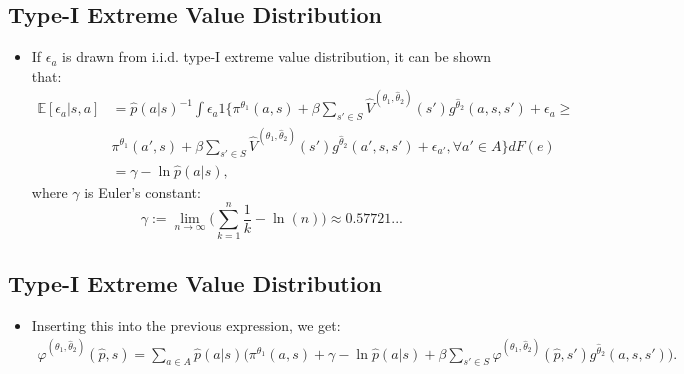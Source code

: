 \documentclass[
]{book}
\providecommand{\tightlist}{%
  \setlength{\itemsep}{0pt}\setlength{\parskip}{0pt}}
\begin{document}
\hypertarget{type-i-extreme-value-distribution-1}{%
\subsection{Type-I Extreme Value Distribution}\label{type-i-extreme-value-distribution-1}}

\begin{itemize}
\tightlist
\item
  If \(\epsilon_a\) is drawn from i.i.d. type-I extreme value distribution, it can be shown that:
  \begin{equation}
  \begin{split}
  \mathbb{E}[\epsilon_{a}|s, a] &= \hat{p}(a|s)^{-1} \int \epsilon_a 1\Bigg\{\pi^{\theta_1}(a , s) + \beta \sum_{s' \in S} \hat{V}^{(\theta_1, \hat{\theta}_2)}(s') g^{\hat{\theta}_2}(a, s, s') + \epsilon_a \ge\\
  &\pi^{\theta_1}(a' , s) + \beta \sum_{s' \in S} \hat{V}^{(\theta_1, \hat{\theta}_2)}(s') g^{\hat{\theta}_2}(a', s, s') + \epsilon_{a'}, \forall a' \in A \Bigg\}dF(e)\\
  &= \gamma - \ln \hat{p}(a|s),
  \end{split}
  \end{equation}
  where \(\gamma\) is Euler's constant:
  \begin{equation}
  \gamma := \lim_{n \to \infty} \Bigg(\sum_{k = 1}^n \frac{1}{k} - \ln(n) \Bigg) \approx 0.57721...
  \end{equation}
\end{itemize}

\hypertarget{type-i-extreme-value-distribution-2}{%
\subsection{Type-I Extreme Value Distribution}\label{type-i-extreme-value-distribution-2}}

\begin{itemize}
\tightlist
\item
  Inserting this into the previous expression, we get:
  \begin{equation}
  \begin{split}
  \varphi^{(\theta_1, \hat{\theta}_2)}(\hat{p}, s) = \sum_{a \in A}\hat{p}(a|s)\Bigg(\pi^{\theta_1}(a, s) + \gamma - \ln \hat{p}(a|s) + \beta \sum_{s' \in S} \varphi^{(\theta_1, \hat{\theta}_2)}(\hat{p}, s') g^{\hat{\theta}_2}(a, s, s')  \Bigg).
  \end{split}
  \end{equation}
\end{itemize}
\end{document}
